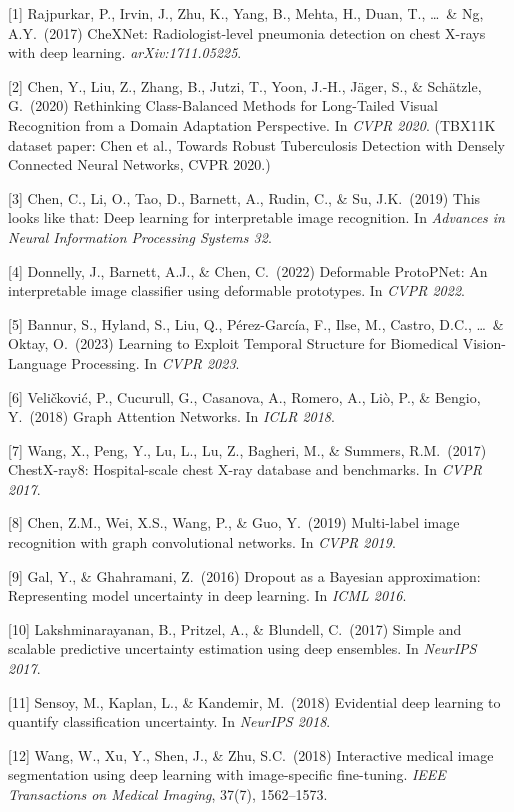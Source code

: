 \documentclass{article}
\begin{document}
{
\small

[1] Rajpurkar, P., Irvin, J., Zhu, K., Yang, B., Mehta, H., Duan, T., \ldots\ \& Ng, A.Y.\ (2017) CheXNet: Radiologist-level pneumonia detection on chest X-rays with deep learning. \textit{arXiv:1711.05225}.

[2] Chen, Y., Liu, Z., Zhang, B., Jutzi, T., Yoon, J.-H., Jäger, S., \& Schätzle, G.\ (2020) Rethinking Class-Balanced Methods for Long-Tailed Visual Recognition from a Domain Adaptation Perspective. In \textit{CVPR 2020}. (TBX11K dataset paper: Chen et al., Towards Robust Tuberculosis Detection with Densely Connected Neural Networks, CVPR 2020.)

[3] Chen, C., Li, O., Tao, D., Barnett, A., Rudin, C., \& Su, J.K.\ (2019) This looks like that: Deep learning for interpretable image recognition. In \textit{Advances in Neural Information Processing Systems 32}.

[4] Donnelly, J., Barnett, A.J., \& Chen, C.\ (2022) Deformable ProtoPNet: An interpretable image classifier using deformable prototypes. In \textit{CVPR 2022}.

[5] Bannur, S., Hyland, S., Liu, Q., Pérez-García, F., Ilse, M., Castro, D.C., \ldots\ \& Oktay, O.\ (2023) Learning to Exploit Temporal Structure for Biomedical Vision-Language Processing. In \textit{CVPR 2023}.

[6] Veličković, P., Cucurull, G., Casanova, A., Romero, A., Liò, P., \& Bengio, Y.\ (2018) Graph Attention Networks. In \textit{ICLR 2018}.

[7] Wang, X., Peng, Y., Lu, L., Lu, Z., Bagheri, M., \& Summers, R.M.\ (2017) ChestX-ray8: Hospital-scale chest X-ray database and benchmarks. In \textit{CVPR 2017}.

[8] Chen, Z.M., Wei, X.S., Wang, P., \& Guo, Y.\ (2019) Multi-label image recognition with graph convolutional networks. In \textit{CVPR 2019}.

[9] Gal, Y., \& Ghahramani, Z.\ (2016) Dropout as a Bayesian approximation: Representing model uncertainty in deep learning. In \textit{ICML 2016}.

[10] Lakshminarayanan, B., Pritzel, A., \& Blundell, C.\ (2017) Simple and scalable predictive uncertainty estimation using deep ensembles. In \textit{NeurIPS 2017}.

[11] Sensoy, M., Kaplan, L., \& Kandemir, M.\ (2018) Evidential deep learning to quantify classification uncertainty. In \textit{NeurIPS 2018}.

[12] Wang, W., Xu, Y., Shen, J., \& Zhu, S.C.\ (2018) Interactive medical image segmentation using deep learning with image-specific fine-tuning. \textit{IEEE Transactions on Medical Imaging}, 37(7), 1562--1573.

}
\end{document}
